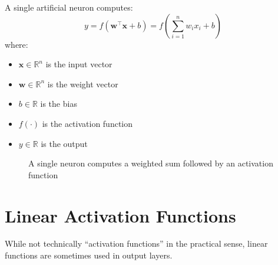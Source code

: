 A single artificial neuron computes:
\begin{equation}
y = f(\mathbf{w}^\top \mathbf{x} + b) = f\left(\sum_{i=1}^{n} w_i x_i + b\right)
\end{equation}
where:
\begin{itemize}
    \item $\mathbf{x} \in \mathbb{R}^n$ is the input vector
    \item $\mathbf{w} \in \mathbb{R}^n$ is the weight vector
    \item $b \in \mathbb{R}$ is the bias
    \item $f(\cdot)$ is the activation function
    \item $y \in \mathbb{R}$ is the output
\end{itemize}

\begin{figure}[h]
    \centering
    \caption[Singe neuron computation]{A single neuron computes a weighted sum followed by an activation function}
    \label{fig:neuron}
\end{figure}

\section{Linear Activation Functions}

While not technically ``activation functions'' in the practical sense, linear functions are sometimes used in output layers.

